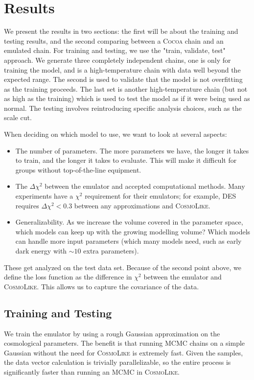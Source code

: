 \section{Results}
We present the results in two sections: the first will be about the training and testing results, and the second comparing between a \textsc{Cocoa} chain and an emulated chain. For training and testing, we use the "train, validate, test" approach. We generate three completely independent chains, one is only for training the model, and is a high-temperature chain with data well beyond the expected range. The second is used to validate that the model is not overfitting as the training proceeds. The last set is another high-temperature chain (but not as high as the training) which is used to test the model as if it were being used as normal. The testing involves reintroducing specific analysis choices, such as the scale cut.

When deciding on which model to use, we want to look at several aspects:
\begin{itemize}
	\item The number of parameters. The more parameters we have, the longer it takes to train, and the longer it takes to evaluate. This will make it difficult for groups without top-of-the-line equipment.
	\item The $\Delta\chi^2$ between the emulator and accepted computational methods. Many experiments have a $\chi^2$ requirement for their emulators; for example, DES requires $\Delta\chi^2<0.3$ between any approximations and \textsc{CosmoLike}.
	\item Generalizability. As we increase the volume covered in the parameter space, which models can keep up with the growing modelling volume? Which models can handle more input parameters (which many models need, such as early dark energy with $\sim10$ extra parameters).
\end{itemize}
These get analyzed on the test data set. Because of the second point above, we define the loss function as the difference in $\chi^2$ between the emulator and \textsc{CosmoLike}. This allows us to capture the covariance of the data.
\subsection{Training and Testing}
We train the emulator by using a rough Gaussian approximation on the cosmological parameters. The benefit is that running MCMC chains on a simple Gaussian without the need for \textsc{CosmoLike} is extremely fast. Given the samples, the data vector calculation is trivially parallelizable, so the entire process is significantly faster than running an MCMC in \textsc{CosmoLike}. 

